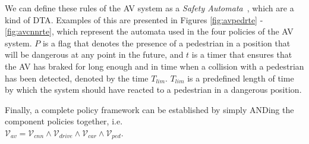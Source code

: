 We can define these rules of the \ac{AV} system as a \textit{Safety Automata}~\cite{recps}, which are a kind of \acf{DTA}. 
Examples of this are presented in Figures \ref{fig:avpedrte} - \ref{fig:avcnnrte}, which represent the automata used in the four policies of the \ac{AV} system.
$P$ is a flag that denotes the presence of a pedestrian in a position that will be dangerous at any point in the future, and $t$ is a timer that ensures that the \ac{AV} has braked for long enough and in time when a collision with a pedestrian has been detected, denoted by the time $T_{lim}$. 
$T_{lim}$ is a predefined length of time by which the system should have reacted to a pedestrian in a dangerous position.

Finally, a complete policy framework can be established by simply ANDing the component policies together, i.e. \\ $\mathcal{V}_{av} = \mathcal{V}_{cnn} \wedge \mathcal{V}_{drive} \wedge \mathcal{V}_{car} \wedge \mathcal{V}_{ped}$.

